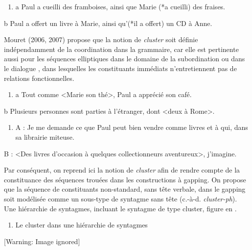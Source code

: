 \begin{enumerate}
\item \label{bkm:Ref290591358}a  Paul a cueilli des framboises, ainsi que Marie (*a cueilli) des fraises. 


\end{enumerate}
  b  Paul a offert un livre à Marie, ainsi qu'(*il a offert) un CD à Anne.  

Mouret (2006, 2007) propose que la notion de \textit{cluster} soit définie indépendamment de la coordination dans la grammaire, car elle est pertinente aussi pour les séquences elliptiques dans le domaine de la subordination  ou dans le dialogue , dans lesquelles les constituants immédiats n'entretiennent pas de relations fonctionnelles.  


\begin{enumerate}
\item \label{bkm:Ref290592974}a  Tout comme {\textless}Marie son thé{\textgreater}, Paul a apprécié son café. 


\end{enumerate}
  b  Plusieurs personnes sont parties à l'étranger, dont {\textless}deux à Rome{\textgreater}.  


\begin{enumerate}
\item \label{bkm:Ref290593112}A :  Je me demande ce que Paul peut bien vendre comme livres et à qui, dans sa librairie miteuse. 


\end{enumerate}
  B :  {\textless}Des livres d'occasion à quelques collectionneurs aventureux{\textgreater}, j'imagine.

Par conséquent, on reprend ici la notion de \textit{cluster} afin de rendre compte de la constituance des séquences trouées dans les constructions à gapping. On propose que la séquence de constituants non-standard, sans tête verbale, dans le gapping soit modélisée comme un sous-type de syntagme sans tête (c.-à-d. \textit{cluster-ph}). Une hiérarchie de syntagmes, incluant le syntagme de type cluster, figure en . 


\begin{enumerate}
\item \label{bkm:Ref299877221}Le cluster dans une hiérarchie de syntagmes


\end{enumerate}
{   [Warning: Image ignored] %
} 

